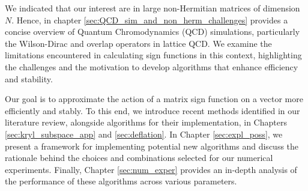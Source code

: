 We indicated that our interest are in large non-Hermitian matrices of dimension $N$. Hence, in chapter \ref{sec:QCD_sim_and_non_herm_challenges} provides a concise overview of Quantum Chromodynamics (QCD) simulations, particularly the Wilson-Dirac and overlap operators in lattice QCD. We examine the limitations encountered in calculating sign functions in this context, highlighting the challenges and the motivation to develop algorithms that enhance efficiency and stability.

Our goal is to approximate the action of a matrix sign function on a vector more efficiently and stably. To this end, we introduce recent methods identified in our literature review, alongside algorithms for their implementation, in Chapters \ref{sec:kryl_subspace_app} and \ref{sec:deflation}. In Chapter \ref{sec:expl_poss}, we present a framework for implementing potential new algorithms and discuss the rationale behind the choices and combinations selected for our numerical experiments. Finally, Chapter \ref{sec:num_exper} provides an in-depth analysis of the performance of these algorithms across various parameters.